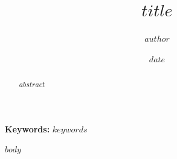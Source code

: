 \documentclass[11pt,a4paper]{article}
\title{$title$}
\author{$author$}
\date{$date$}
\begin{document}
\maketitle

\begin{abstract}
$abstract$
\end{abstract}

\noindent\textbf{Keywords:} $keywords$

$body$

\end{document}
